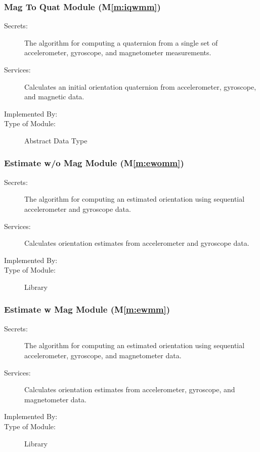 \documentclass[12pt, titlepage]{article}
\newcommand{\mref}[1]{M\ref{#1}}
\begin{document}
\subsubsection{Mag To Quat Module (\mref{m:iqwmm})}

\begin{description}
\item[Secrets:] The algorithm for computing a quaternion from a single set of accelerometer, gyroscope, and magnetometer measurements.
\item[Services:] Calculates an initial orientation quaternion from accelerometer, gyroscope, and magnetic data.
\item[Implemented By:] \progname
\item[Type of Module:] Abstract Data Type
\end{description}

\subsubsection{Estimate w/o Mag Module (\mref{m:ewomm})}

\begin{description}
\item[Secrets:] The algorithm for computing an estimated orientation using sequential accelerometer and gyroscope data.
\item[Services:] Calculates orientation estimates from accelerometer and gyroscope data.
\item[Implemented By:] \progname
\item[Type of Module:] Library
\end{description}

\subsubsection{Estimate w Mag Module (\mref{m:ewmm})}

\begin{description}
\item[Secrets:] The algorithm for computing an estimated orientation using sequential accelerometer, gyroscope, and magnetometer data.
\item[Services:] Calculates orientation estimates from accelerometer, gyroscope, and magnetometer data.
\item[Implemented By:] \progname
\item[Type of Module:] Library
\end{description}
\end{document}
